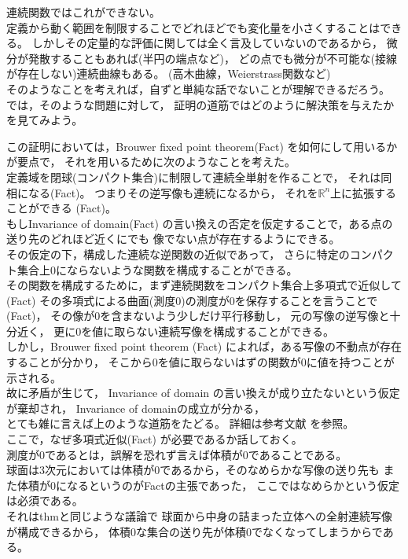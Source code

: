 \documentclass[uplatex]{jsarticle}
\begin{document}
連続関数ではこれができない。\\

定義から動く範囲を制限することでどれほどでも変化量を小さくすることはできる。
しかしその定量的な評価に関しては全く言及していないのであるから，
微分が発散することもあれば(半円の端点など)，
どの点でも微分が不可能な(接線が存在しない)連続曲線もある。
(高木曲線，Weierstrass関数など)\\
そのようなことを考えれば，自ずと単純な話でないことが理解できるだろう。
では，そのような問題に対して，
証明の道筋ではどのように解決策を与えたかを見てみよう。

この証明においては，Brouwer fixed point theorem(Fact)
を如何にして用いるかが要点で，
それを用いるために次のようなことを考えた。\\
定義域を閉球(コンパクト集合)に制限して連続全単射を作ることで，
それは同相になる(Fact)。
つまりその逆写像も連続になるから，
それを\(\mathbb{R}^n\)上に拡張することができる
(Fact)。\\
もしInvariance of domain(Fact)
の言い換えの否定を仮定することで，ある点の送り先のどれほど近くにでも
像でない点が存在するようにできる。\\
その仮定の下，構成した連続な逆関数の近似であって，
さらに特定のコンパクト集合上0にならないような関数を構成することができる。\\
その関数を構成するために，まず連続関数をコンパクト集合上多項式で近似して
(Fact)
その多項式による曲面(測度0)の測度が0を保存することを言うことで
(Fact)，
その像が0を含まないよう少しだけ平行移動し，
元の写像の逆写像と十分近く，
更に0を値に取らない連続写像を構成することができる。\\
しかし，Brouwer fixed point theorem
(Fact)
によれば，ある写像の不動点が存在することが分かり，
そこから0を値に取らないはずの関数が0に値を持つことが示される。\\
故に矛盾が生じて，
Invariance of domain
の言い換えが成り立たないという仮定が棄却され，
Invariance of domainの成立が分かる，\\
とても雑に言えば上のような道筋をたどる。
詳細は参考文献\cite{tao}
を参照。\\

ここで，なぜ多項式近似(Fact)
が必要であるか話しておく。\\
測度が0であるとは，誤解を恐れず言えば体積が0であることである。\\
球面は3次元においては体積が0であるから，そのなめらかな写像の送り先も
また体積が0になるというのがFactの主張であった，
ここではなめらかという仮定は必須である。\\
それはthmと同じような議論で
球面から中身の詰まった立体への全射連続写像が構成できるから，
体積0な集合の送り先が体積0でなくなってしまうからである。\\
\end{document}
